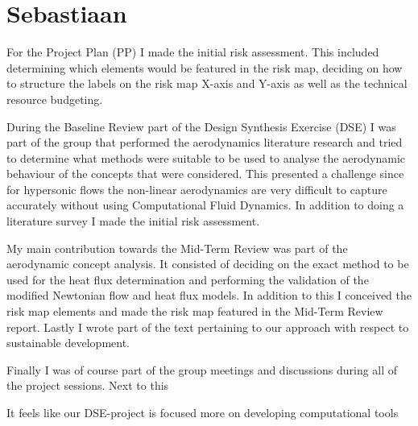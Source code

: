 \section{Sebastiaan}
For the Project Plan (PP) I made the initial risk assessment. This included determining which elements would be featured in the risk map, deciding on how to structure the labels on the risk map X-axis and Y-axis as well as the technical resource budgeting.

During the Baseline Review part of the Design Synthesis Exercise (DSE) I was part of the group that performed the aerodynamics literature research and tried to determine what methods were suitable to be used to analyse the aerodynamic behaviour of the concepts that were considered. This presented a challenge since for hypersonic flows the non-linear aerodynamics are very difficult to capture accurately without using Computational Fluid Dynamics. In addition to doing a literature survey I made the initial risk assessment.

My main contribution towards the Mid-Term Review was part of the aerodynamic concept analysis. It consisted of deciding on the exact method to be used for the heat flux determination and performing the validation of the modified Newtonian flow and heat flux models. In addition to this I conceived the risk map elements and made the risk map featured in the Mid-Term Review report. Lastly I wrote part of the text pertaining to our approach with respect to sustainable development.

Finally I was of course part of the group meetings and discussions during all of the project sessions. Next to this 

It feels like our DSE-project is focused more on developing computational tools